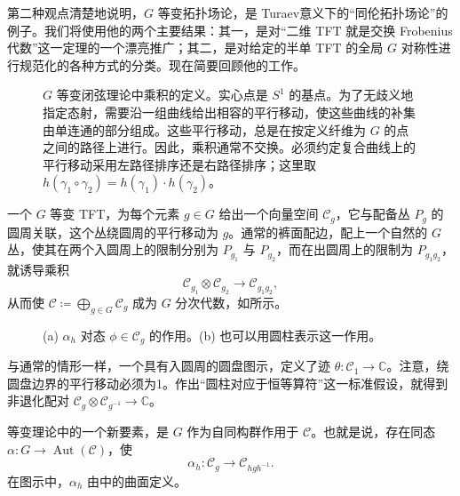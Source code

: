 第二种观点清楚地说明，$G$ 等变拓扑场论，是 Turaev意义下的“同伦拓扑场论”的例子。我们将使用他的两个主要结果：其一，是对“二维 TFT 就是交换 Frobenius 代数”这一定理的一个漂亮推广；其二，是对给定的半单 TFT 的全局 $G$ 对称性进行规范化的各种方式的分类。现在简要回顾他的工作。

\begin{figure}[H]
\centering
{}
\caption{$G$ 等变闭弦理论中乘积的定义。实心点是 $S^1$ 的基点。为了无歧义地指定态射，需要沿一组曲线给出相容的平行移动，使这些曲线的补集由单连通的部分组成。这些平行移动，总是在按定义纤维为 $G$ 的点之间的路径上进行。因此，乘积通常不交换。必须约定复合曲线上的平行移动采用左路径排序还是右路径排序；这里取 $h(\gamma_1\circ\gamma_2)=h(\gamma_1)\cdot h(\gamma_2)$。}\label{fig:2.15}
\end{figure}

一个 $G$ 等变 TFT，为每个元素 $g\in G$ 给出一个向量空间 $\mathcal{C}_g$，它与配备丛 $P_g$ 的圆周关联，这个丛绕圆周的平行移动为 $g$。通常的裤面配边，配上一个自然的 $G$ 丛，使其在两个入圆周上的限制分别为 $P_{g_1}$ 与 $P_{g_2}$，而在出圆周上的限制为 $P_{g_1g_2}$，就诱导乘积
\begin{equation}\label{eq:2.80}
\mathcal{C}_{g_1}\otimes\mathcal{C}_{g_2}\longrightarrow\mathcal{C}_{g_1g_2},
\end{equation}
从而使 $\mathcal{C}\coloneqq\bigoplus_{g\in G}\mathcal{C}_g$ 成为 $G$ 分次代数，如所示。

\begin{figure}[H]
\centering
{}
\caption{(a) $\alpha_h$ 对态 $\phi\in\mathcal{C}_g$ 的作用。(b) 也可以用圆柱表示这一作用。}\label{fig:2.16}
\end{figure}

与通常的情形一样，一个具有入圆周的圆盘图示，定义了迹 $\theta\colon\mathcal{C}_1\to\mathbb{C}$。注意，绕圆盘边界的平行移动必须为1。作出“圆柱对应于恒等算符”这一标准假设，就得到非退化配对 $\mathcal{C}_g\otimes\mathcal{C}_{g^{-1}}\to\mathbb{C}$。

等变理论中的一个新要素，是 $G$ 作为自同构群作用于 $\mathcal{C}$。也就是说，存在同态 $\alpha\colon G\to\operatorname{Aut}(\mathcal{C})$，使
\begin{equation}\label{eq:2.81}
\alpha_h\colon\mathcal{C}_g\longrightarrow\mathcal{C}_{hgh^{-1}}.
\end{equation}
在图示中，$\alpha_h$ 由中的曲面定义。

